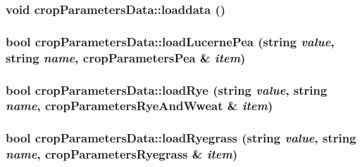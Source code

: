 \label{classcrop_parameters_data_a3054f915f09e2911f88d396dd5b25ac6}
\hypertarget{classcrop_parameters_data_aa489bba3aa8fc77a3819276b1abbe409}{
\subsubsection[{loaddata}]{\setlength{\rightskip}{0pt plus 5cm}void cropParametersData::loaddata ()}}
\label{classcrop_parameters_data_aa489bba3aa8fc77a3819276b1abbe409}
\hypertarget{classcrop_parameters_data_a1d241b4868952e5f6f9b7f2e1f73a520}{
\subsubsection[{loadLucernePea}]{\setlength{\rightskip}{0pt plus 5cm}bool cropParametersData::loadLucernePea (string {\em value}, \/  string {\em name}, \/  {\bf cropParametersPea} \& {\em item})}}
\label{classcrop_parameters_data_a1d241b4868952e5f6f9b7f2e1f73a520}
\hypertarget{classcrop_parameters_data_a7b60e3ff4fc1a29f1474a50abc1e79f2}{
\subsubsection[{loadRye}]{\setlength{\rightskip}{0pt plus 5cm}bool cropParametersData::loadRye (string {\em value}, \/  string {\em name}, \/  {\bf cropParametersRyeAndWweat} \& {\em item})}}
\label{classcrop_parameters_data_a7b60e3ff4fc1a29f1474a50abc1e79f2}
\hypertarget{classcrop_parameters_data_a71647e2d359844346d6b8539e7e1fd5d}{
\subsubsection[{loadRyegrass}]{\setlength{\rightskip}{0pt plus 5cm}bool cropParametersData::loadRyegrass (string {\em value}, \/  string {\em name}, \/  {\bf cropParametersRyegrass} \& {\em item})}}
\label{classcrop_parameters_data_a71647e2d359844346d6b8539e7e1fd5d}


